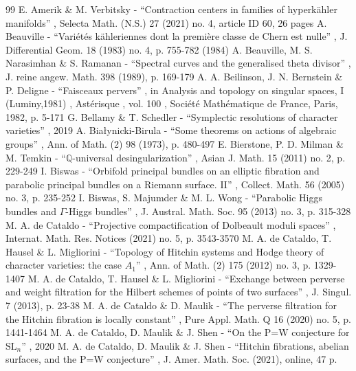 \documentclass[11pt]{article}
\theoremstyle{definition}
\begin{document}
\begin{thebibliography}{99}
 E. Amerik \& M. Verbitsky - “Contraction centers in families of hyperkähler manifolds” , Selecta Math. (N.S.) 27 (2021) no. 4, article ID 60, 26 pages
 A. Beauville - “Variétés kähleriennes dont la première classe de Chern est nulle” , J. Differential Geom. 18 (1983) no. 4, p. 755-782 (1984)
 A. Beauville, M. S. Narasimhan \& S. Ramanan - “Spectral curves and the generalised theta divisor” , J. reine angew. Math. 398 (1989), p. 169-179
 A. A. Beilinson, J. N. Bernstein \& P. Deligne - “Faisceaux pervers” , in Analysis and topology on singular spaces, I (Luminy,1981) , Astérisque , vol. 100 , Société Mathématique de France, Paris, 1982, p. 5-171
 G. Bellamy \& T. Schedler - “Symplectic resolutions of character varieties” , 2019
 A. Białynicki-Birula - “Some theorems on actions of algebraic groups” , Ann. of Math. (2) 98 (1973), p. 480-497
 E. Bierstone, P. D. Milman \& M. Temkin - “$\mathbb{Q}$-universal desingularization” , Asian J. Math. 15 (2011) no. 2, p. 229-249
 I. Biswas - “Orbifold principal bundles on an elliptic fibration and parabolic principal bundles on a Riemann surface. II” , Collect. Math. 56 (2005) no. 3, p. 235-252
 I. Biswas, S. Majumder \& M. L. Wong - “Parabolic Higgs bundles and $\Gamma $-Higgs bundles” , J. Austral. Math. Soc. 95 (2013) no. 3, p. 315-328
 M. A. de Cataldo - “Projective compactification of Dolbeault moduli spaces” , Internat. Math. Res. Notices (2021) no. 5, p. 3543-3570
 M. A. de Cataldo, T. Hausel \& L. Migliorini - “Topology of Hitchin systems and Hodge theory of character varieties: the case $A_1$” , Ann. of Math. (2) 175 (2012) no. 3, p. 1329-1407
 M. A. de Cataldo, T. Hausel \& L. Migliorini - “Exchange between perverse and weight filtration for the Hilbert schemes of points of two surfaces” , J. Singul. 7 (2013), p. 23-38
 M. A. de Cataldo \& D. Maulik - “The perverse filtration for the Hitchin fibration is locally constant” , Pure Appl. Math. Q 16 (2020) no. 5, p. 1441-1464
 M. A. de Cataldo, D. Maulik \& J. Shen - “On the P=W conjecture for $\mathrm{SL}_n$” , 2020
 M. A. de Cataldo, D. Maulik \& J. Shen - “Hitchin fibrations, abelian surfaces, and the P=W conjecture” , J. Amer. Math. Soc. (2021), online, 47 p.

\end{thebibliography}
\end{document}
